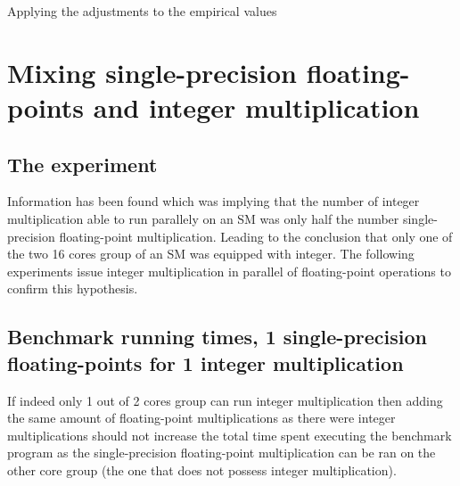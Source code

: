 \documentclass{article}
\begin{document}
    Applying the adjustments to the empirical values %

\section{Mixing single-precision floating-points and integer multiplication}
	\subsection{The experiment}
	Information has been found which was implying that the number of integer multiplication
    able to run parallely on an SM was only half the number single-precision floating-point
    multiplication. Leading to the conclusion that only one of the two 16 cores group of an
    SM was equipped with integer. The following experiments issue integer multiplication in
    parallel of floating-point operations to confirm this hypothesis.
	\subsection{Benchmark running times, 1 single-precision floating-points for 1 integer multiplication}
	If indeed only 1 out of 2 cores group can run integer multiplication then
    adding the same amount of floating-point multiplications as there were integer
    multiplications should not increase the total time spent executing the benchmark 
    program as the single-precision floating-point multiplication can
    be ran on the other core group (the one that does not possess integer multiplication).
	
\end{document}
